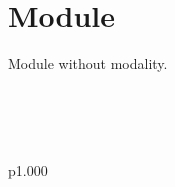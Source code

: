 \section{Module }\label{Oxcaml-M1}%
Module without modality.

\label{Oxcaml-M1--val-x}\\
\label{Oxcaml-M1--val-f}\\
\label{Oxcaml-M1--type-s}\\
\begin{ocamltabular}{p{1.000\textwidth}}\label{Oxcaml-M1--type-s.a}\\
\end{ocamltabular}%
\\
\ocamlcodefragment{\}}\\


